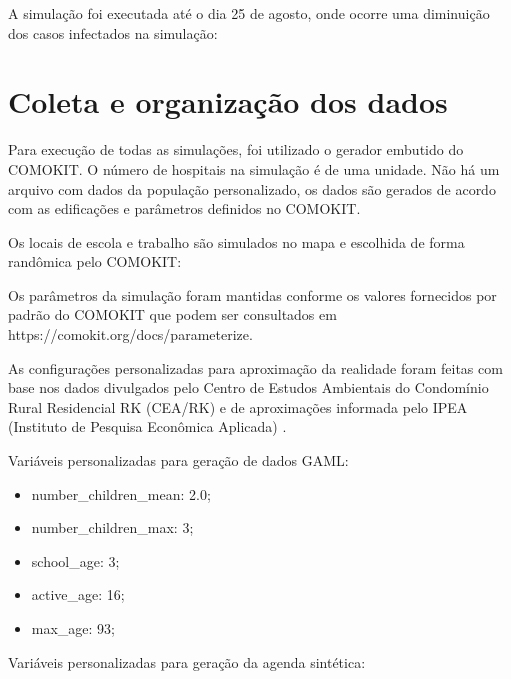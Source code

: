 
A simulação foi executada até o dia 25 de agosto, onde ocorre uma diminuição dos casos infectados na simulação:


\section{Coleta e organização dos dados}

Para execução de todas as simulações, foi utilizado o gerador embutido do COMOKIT. O número de hospitais na simulação é de uma unidade. Não há um arquivo com dados da população personalizado, os dados são gerados de acordo com as edificações e parâmetros definidos no COMOKIT.

Os locais de escola e trabalho são simulados no mapa e escolhida de forma randômica pelo COMOKIT:


Os parâmetros da simulação foram mantidas conforme os valores fornecidos por padrão do COMOKIT que podem ser consultados em https://comokit.org/docs/parameterize.

As configurações personalizadas para aproximação da realidade foram feitas com base nos dados divulgados pelo Centro de Estudos Ambientais do Condomínio Rural Residencial RK (CEA/RK) e de aproximações informada pelo IPEA (Instituto de Pesquisa Econômica Aplicada) \cite{IPEA:online}.

Variáveis personalizadas para geração de dados GAML:

\begin{itemize}
\item number\_children\_mean: 2.0;
\item number\_children\_max: 3;
\item school\_age: 3;
\item active\_age: 16;
\item max\_age: 93;
\end{itemize}

Variáveis personalizadas para geração da agenda sintética:

